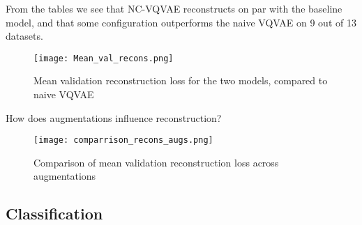 \documentclass[../../thesis.tex]{subfiles}
\begin{document}
From the tables we see that NC-VQVAE reconstructs on par with  the baseline model, and that some configuration outperforms the naive VQVAE on 9 out of 13 datasets. 

\begin{figure}[H]
    \label{fig:Mean_val_recons}
    \texttt{[image: Mean\_val\_recons.png]}
    \centering  
    \caption{Mean validation reconstruction loss for the two models, compared to naive VQVAE}
\end{figure}

How does augmentations influence reconstruction?
\begin{figure}[H]
    \label{fig:comparrison_recons_augs}
    \texttt{[image: comparrison\_recons\_augs.png]}
    \centering  
    \caption{Comparison of mean validation reconstruction loss across augmentations}
\end{figure}


\subsection{Classification}
\end{document}

